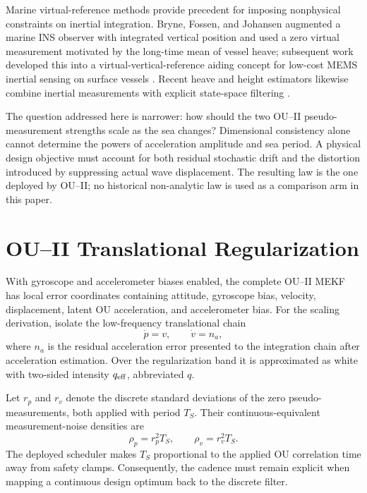 \documentclass[conference]{IEEEtran}
\begin{document}
Marine virtual-reference methods provide precedent for imposing nonphysical
constraints on inertial integration. Bryne, Fossen, and Johansen augmented a
marine INS observer with integrated vertical position and used a zero virtual
measurement motivated by the long-time mean of vessel heave; subsequent work
developed this into a virtual-vertical-reference aiding concept for low-cost
MEMS inertial sensing on surface vessels \cite{Bryne2014,Bryne2015,Bryne2018,Rogne2021}.
Recent heave and height estimators likewise combine inertial measurements with
explicit state-space filtering \cite{Reis2023,Overaas2025,Li2025}.

The question addressed here is narrower: how should the two OU--II
pseudo-measurement strengths scale as the sea changes? Dimensional consistency
alone cannot determine the powers of acceleration amplitude and sea period. A
physical design objective must account for both residual stochastic drift and
the distortion introduced by suppressing actual wave displacement. The
resulting law is the one deployed by OU--II; no historical non-analytic law is
used as a comparison arm in this paper.

\section{OU--II Translational Regularization}
\label{sec:implementation}

With gyroscope and accelerometer biases enabled, the complete OU--II MEKF has
local error coordinates containing attitude, gyroscope bias, velocity,
displacement, latent OU acceleration, and accelerometer bias. For the scaling
derivation, isolate the low-frequency translational chain
\begin{equation}
 \dot p=v,\qquad \dot v=n_a,
 \label{eq:double-integrator}
\end{equation}
where $n_a$ is the residual acceleration error presented to the integration
chain after acceleration estimation. Over the regularization band it is
approximated as white with two-sided intensity $q_{\rm eff}$, abbreviated $q$.

Let $r_p$ and $r_v$ denote the discrete standard deviations of the zero
pseudo-measurements, both applied with period $T_S$. Their continuous-equivalent
measurement-noise densities are
\begin{equation}
 \rho_p=r_p^2T_S,
 \qquad
 \rho_v=r_v^2T_S.
 \label{eq:continuous-densities}
\end{equation}
The deployed scheduler makes $T_S$ proportional to the applied OU correlation
time away from safety clamps. Consequently, the cadence must remain explicit
when mapping a continuous design optimum back to the discrete filter.
\end{document}
